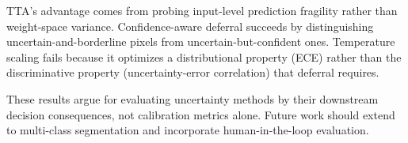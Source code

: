 \documentclass[runningheads]{llncs}
\begin{document}
TTA's advantage comes from probing input-level prediction fragility rather
than weight-space variance. Confidence-aware deferral succeeds by
distinguishing uncertain-and-borderline pixels from uncertain-but-confident
ones. Temperature scaling fails because it optimizes a distributional property
(ECE) rather than the discriminative property (uncertainty-error correlation)
that deferral requires.

These results argue for evaluating uncertainty methods by their downstream
decision consequences, not calibration metrics alone. Future work should
extend to multi-class segmentation and incorporate human-in-the-loop
evaluation.



\end{document}
